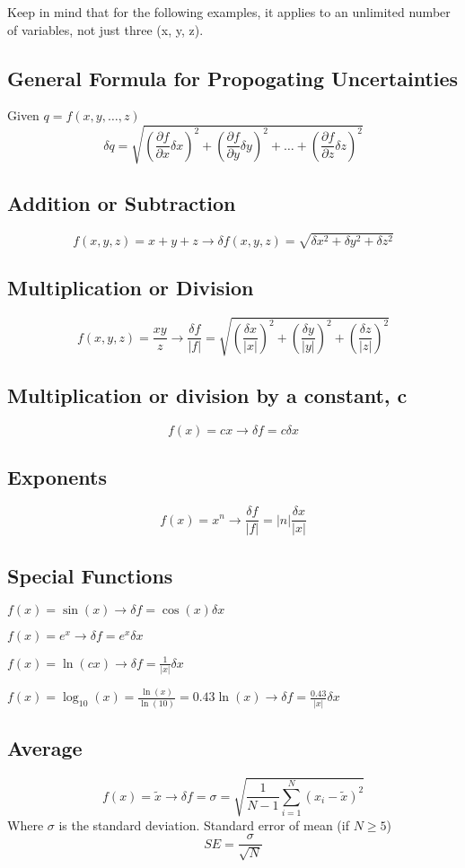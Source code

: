 Keep in mind that for the following examples, it applies to an unlimited number of variables, not
just three (x, y, z).

\subsection{General Formula for Propogating Uncertainties}
Given $q=f(x,y,\dots,z)$
\[
    \delta q=\sqrt{\left(\frac{\partial f}{\partial x}\delta x\right)^2+\left(\frac{\partial f}{\partial y}\delta y\right)^2+\dots+\left(\frac{\partial f}{\partial z}\delta z\right)^2}
\]

\subsection{Addition or Subtraction}
\[
    f(x,y,z)=x+y+z\to\delta f(x,y,z)=\sqrt{\delta x^2+\delta y^2+\delta z^2}
\]

\subsection{Multiplication or Division}
\[
    f(x,y,z)=\frac{xy}{z}\to \frac{\delta f}{|f|}=\sqrt{\left(\frac{\delta x}{|x|}\right)^2+\left(\frac{\delta y}{|y|}\right)^2+ \left(\frac{\delta z}{|z|}\right)^2}
\]

\subsection{Multiplication or division by a constant, c}
\[
    f(x)=cx\to\delta f=c\delta x
\]

\subsection{Exponents}
\[
    f(x)=x^n\to \frac{\delta f}{|f|}=|n|\frac{\delta x}{|x|}
\]

\subsection{Special Functions}
\begin{enum}
    \item $f(x)=\sin(x)\to\delta f=\cos(x)\delta x$
    \item $f(x)=e^x\to\delta f=e^x\delta x$
    \item $f(x)=\ln(cx)\to\delta f=\frac{1}{|x|}\delta x$
    \item $f(x)=\log_{10}(x)=\frac{\ln(x)}{\ln(10)}=0.43\ln(x)\to\delta f=\frac{0.43}{|x|}\delta x$
\end{enum}

\subsection{Average}
\[
    f(x)=\tilde{x}\to\delta f=\sigma=\sqrt{\frac{1}{N-1}\sum_{i=1}^N(x_i-\tilde{x})^2}
\]
Where $\sigma$ is the standard deviation. Standard error of mean (if $N\geq5$)
\[
    SE=\frac{\sigma}{\sqrt{N}}
\]